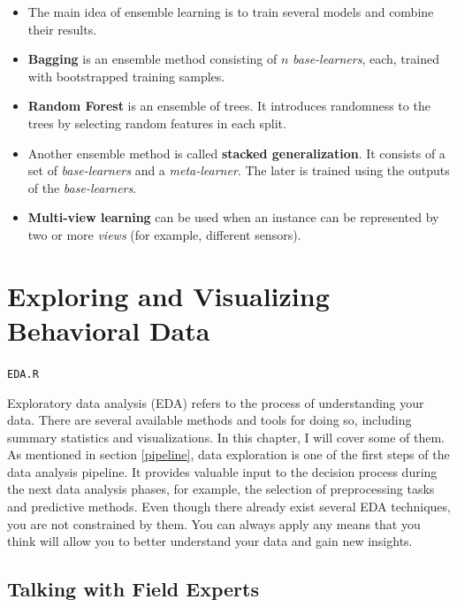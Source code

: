\documentclass[
  11pt,
]{krantz}
\makeatletter
\providecommand{\tightlist}{%
  \setlength{\itemsep}{0pt}\setlength{\parskip}{0pt}}
\newenvironment{kframe}{%
\medskip{}
\setlength{\fboxsep}{.8em}
 \def\at@end@of@kframe{}%
 \ifinner\ifhmode%
  \def\at@end@of@kframe{\end{minipage}}%
  \begin{minipage}{\columnwidth}%
 \fi\fi%
 \def\FrameCommand##1{\hskip\@totalleftmargin \hskip-\fboxsep
 \colorbox{shadecolor}{##1}\hskip-\fboxsep
     \hskip-\linewidth \hskip-\@totalleftmargin \hskip\columnwidth}%
 \MakeFramed {\advance\hsize-\width
   \@totalleftmargin\z@ \linewidth\hsize
   \@setminipage}}%
 {\par\unskip\endMakeFramed%
 \at@end@of@kframe}
\newenvironment{rmdblock}[1]
  {
  \begin{itemize}
  \renewcommand{\labelitemi}{
    \raisebox{-.7\height}[0pt][0pt]{
      {\setkeys{Gin}{width=3em,keepaspectratio}\texttt{[image: images/icons/\#1]}}
    }
  }
  \setlength{\fboxsep}{1em}
  \begin{kframe}
  \item
  }
  {
  \end{kframe}
  \end{itemize}
  }
\newenvironment{rmdfolder}
  {\begin{rmdblock}{folder}}
  {\end{rmdblock}}
\makeatother
\begin{document}
\begin{itemize}
\tightlist
\item
  The main idea of ensemble learning is to train several models and combine their results.
\item
  \textbf{Bagging} is an ensemble method consisting of \(n\) \emph{base-learners}, each, trained with bootstrapped training samples.
\item
  \textbf{Random Forest} is an ensemble of trees. It introduces randomness to the trees by selecting random features in each split.
\item
  Another ensemble method is called \textbf{stacked generalization}. It consists of a set of \emph{base-learners} and a \emph{meta-learner}. The later is trained using the outputs of the \emph{base-learners}.
\item
  \textbf{Multi-view learning} can be used when an instance can be represented by two or more \emph{views} (for example, different sensors).
\end{itemize}



\hypertarget{edavis}{%
\chapter{Exploring and Visualizing Behavioral Data}\label{edavis}}

\begin{rmdfolder}
\texttt{EDA.R}
\end{rmdfolder}

Exploratory data analysis (EDA) refers to the process of understanding your data. There are several available methods and tools for doing so, including summary statistics and visualizations. In this chapter, I will cover some of them. As mentioned in section \ref{pipeline}, data exploration is one of the first steps of the data analysis pipeline. It provides valuable input to the decision process during the next data analysis phases, for example, the selection of preprocessing tasks and predictive methods. Even though there already exist several EDA techniques, you are not constrained by them. You can always apply any means that you think will allow you to better understand your data and gain new insights.

\hypertarget{talking-with-field-experts}{%
\section{Talking with Field Experts}\label{talking-with-field-experts}}
\end{document}
